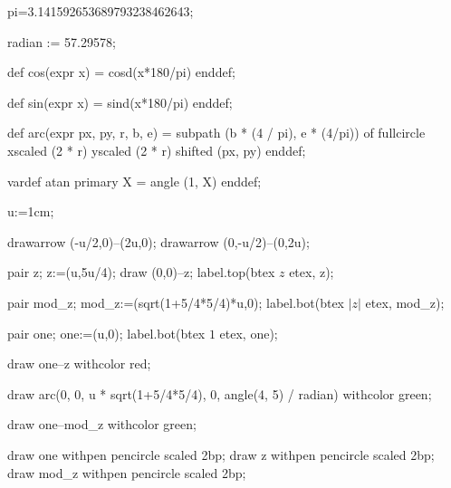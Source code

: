 pi=3.141592653689793238462643;

radian := 57.29578;

def cos(expr x) = cosd(x*180/pi) enddef;

def sin(expr x) = sind(x*180/pi) enddef;

def arc(expr px, py, r, b, e) = subpath (b * (4 / pi), e * (4/pi)) of fullcircle xscaled (2 * r) yscaled (2 * r) shifted (px, py) enddef;

vardef atan primary X = angle (1, X) enddef;


u:=1cm;

drawarrow (-u/2,0)--(2u,0);
drawarrow (0,-u/2)--(0,2u);

pair z;
z:=(u,5u/4);
draw (0,0)--z;
label.top(btex $z$ etex, z);

pair mod_z;
mod_z:=(sqrt(1+5/4*5/4)*u,0);
label.bot(btex $|z|$ etex, mod_z);

pair one;
one:=(u,0);
label.bot(btex $1$ etex, one);

draw one--z withcolor red;

draw arc(0, 0, u * sqrt(1+5/4*5/4), 0, angle(4, 5) / radian) withcolor green;

draw one--mod_z withcolor green;

draw one withpen pencircle scaled 2bp;
draw z withpen pencircle scaled 2bp;
draw mod_z withpen pencircle scaled 2bp;